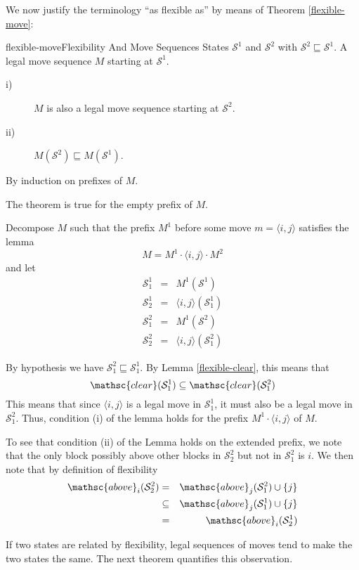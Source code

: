\documentclass{article}
\newcommand{\bstate}{{\mathcal{S}}}
\newcommand{\bclear}{{\mathsc{clear}}}
\newcommand{\babove}{{\mathsc{above}}}
\begin{document}
We now justify the terminology ``as flexible as''
by means of Theorem \ref{flexible-move}:
\begin{theorem}{flexible-move}{Flexibility And Move Sequences}
\given
States $\bstate^1$ and $\bstate^2$ with $\bstate^2 \sqsubseteq \bstate^1$.
A legal move sequence $M$ starting at $\bstate^1$.
\prove
\begin{description}
\item[i)~] $M$ is also a legal move sequence starting at $\bstate^2$.
\item[ii)~] $M(\bstate^2) \sqsubseteq M(\bstate^1)$.
\end{description}
\proof
By induction on prefixes of $M$.

\basecase
The theorem is true for the empty prefix of $M$.

\indcase
Decompose $M$ such that the prefix $M^1$ before
some move $m = \langle i, j \rangle$ satisfies the lemma $$
  M = M^1 \cdot \langle i, j \rangle \cdot M^2
$$
and let
\begin{eqnarray*}
  \bstate^1_1 &=& M^1(\bstate^1) \\
  \bstate^1_2 &=& \langle i, j \rangle(\bstate^1_1) \\
  \bstate^2_1 &=& M^1(\bstate^2) \\
  \bstate^2_2 &=& \langle i, j \rangle(\bstate^2_1)
\end{eqnarray*}

By hypothesis we have $\bstate^2_1 \sqsubseteq \bstate^1_1$.
By Lemma \ref{flexible-clear}, this means that $$
  \bclear(\bstate^1_1) \subseteq \bclear(\bstate^2_1)
$$
This means that since $\langle i, j \rangle$ is a legal
move in $\bstate^1_1$, it must also be a legal move in
$\bstate^2_1$.  Thus, condition (i) of the lemma holds
for the prefix $M^1 \cdot \langle i, j \rangle$ of $M$.

To see that condition (ii) of the Lemma holds on the extended
prefix, we note that the only block possibly above other blocks in
$\bstate^2_2$ but not in $\bstate^2_1$ is $i$.  We then note that
by definition of flexibility
\begin{eqnarray*}
  \babove_i(\bstate^2_2) &=& \babove_j(\bstate^2_1) \cup \{j\} \\
  &\subseteq& \babove_j(\bstate^1_1) \cup \{j\} \\
  &=& \babove_i(\bstate^1_2)
\end{eqnarray*}
\end{theorem}

If two states are related by flexibility, legal sequences of
moves tend to make the two states the same.  The next theorem
quantifies this observation.
\end{document}
